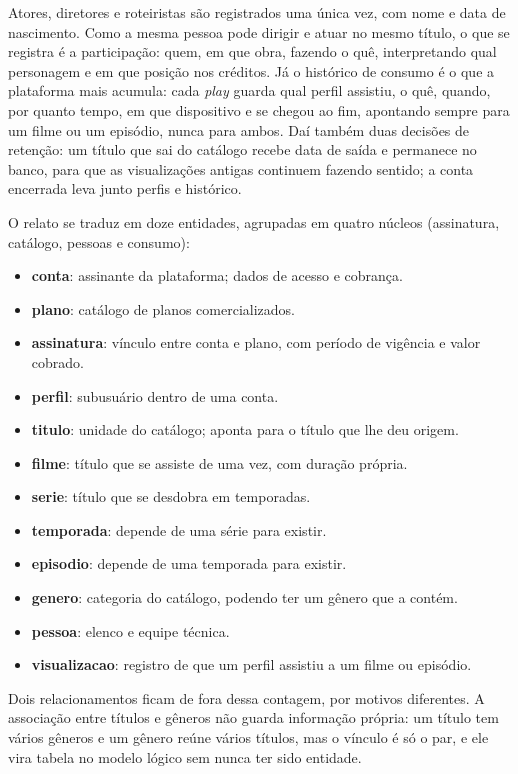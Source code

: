 \documentclass[a4paper,12pt,oneside,openany]{book}
\begin{document}
Atores, diretores e roteiristas são registrados uma única vez, com nome e data
de nascimento. Como a mesma pessoa pode dirigir e atuar no mesmo título, o que
se registra é a participação: quem, em que obra, fazendo o quê, interpretando
qual personagem e em que posição nos créditos. Já o histórico de consumo é o
que a plataforma mais acumula: cada \textit{play} guarda qual perfil assistiu,
o quê, quando, por quanto tempo, em que dispositivo e se chegou ao fim,
apontando sempre para um filme ou um episódio, nunca para ambos. Daí também
duas decisões de retenção: um título que sai do catálogo recebe data de saída
e permanece no banco, para que as visualizações antigas continuem fazendo
sentido; a conta encerrada leva junto perfis e histórico.

O relato se traduz em doze entidades, agrupadas em quatro núcleos (assinatura,
catálogo, pessoas e consumo):

\begin{itemize}[label=--, leftmargin=*, itemsep=2pt]
  \item \textbf{conta}: assinante da plataforma; dados de acesso e cobrança.
  \item \textbf{plano}: catálogo de planos comercializados.
  \item \textbf{assinatura}: vínculo entre conta e plano, com período de vigência e valor cobrado.
  \item \textbf{perfil}: subusuário dentro de uma conta.
  \item \textbf{titulo}: unidade do catálogo; aponta para o título que lhe deu origem.
  \item \textbf{filme}: título que se assiste de uma vez, com duração própria.
  \item \textbf{serie}: título que se desdobra em temporadas.
  \item \textbf{temporada}: depende de uma série para existir.
  \item \textbf{episodio}: depende de uma temporada para existir.
  \item \textbf{genero}: categoria do catálogo, podendo ter um gênero que a contém.
  \item \textbf{pessoa}: elenco e equipe técnica.
  \item \textbf{visualizacao}: registro de que um perfil assistiu a um filme ou episódio.
\end{itemize}

Dois relacionamentos ficam de fora dessa contagem, por motivos diferentes. A
associação entre títulos e gêneros não guarda informação própria: um título tem
vários gêneros e um gênero reúne vários títulos, mas o vínculo é só o par, e
ele vira tabela no modelo lógico sem nunca ter sido entidade.
\end{document}
